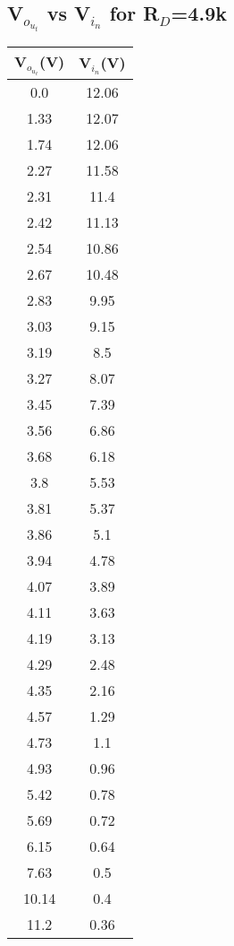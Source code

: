 \documentclass[12pt]{article}
\begin{document}
\subsection{V$_o_u_t$ vs V$_i_n$ for R$_D$=4.9k\Omega}
\begin{center}
 \begin{tabular}{|| c | c||} 
 \hline
 V$_o_u_t$(V) &  V$_i_n$(V)\\ [0.5ex] 
 \hline\hline
 0.0 & 12.06 \\
\hline
1.33 & 12.07 \\
\hline
1.74 & 12.06 \\
\hline
2.27 & 11.58 \\
\hline
2.31 & 11.4 \\
\hline
2.42 & 11.13 \\
\hline
2.54 & 10.86 \\
\hline
2.67 & 10.48 \\
\hline
2.83 & 9.95 \\
\hline
3.03 & 9.15 \\
\hline
3.19 & 8.5 \\
\hline
3.27 & 8.07 \\
\hline
3.45 & 7.39 \\
\hline
3.56 & 6.86 \\
\hline
3.68 & 6.18 \\
\hline
3.8 & 5.53 \\
\hline
3.81 & 5.37 \\
\hline
3.86 & 5.1 \\
\hline
3.94 & 4.78 \\
\hline
4.07 & 3.89 \\
\hline
4.11 & 3.63 \\
\hline
4.19 & 3.13 \\
\hline
4.29 & 2.48 \\
\hline
4.35 & 2.16 \\
\hline
4.57 & 1.29 \\
\hline
4.73 & 1.1 \\
\hline
4.93 & 0.96 \\
\hline
5.42 & 0.78 \\
\hline
5.69 & 0.72 \\
\hline
6.15 & 0.64 \\
\hline
7.63 & 0.5 \\
\hline
10.14 & 0.4 \\
\hline
11.2 & 0.36 \\
\hline

\end{tabular}
\end{center}
\end{document}
